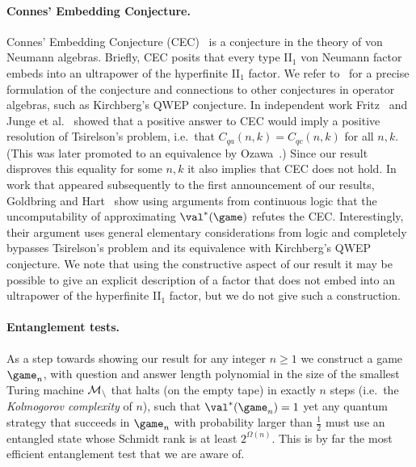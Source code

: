 \paragraph{Connes' Embedding Conjecture.} 
Connes' Embedding Conjecture (CEC)~\cite{connes1976classification} is a conjecture in the theory of von Neumann algebras. Briefly, CEC posits that every type II$_1$ von Neumann factor embeds into an ultrapower of the hyperfinite II$_1$ factor. We refer to~\cite{ozawa2013connes} for a precise formulation of the conjecture and connections to other conjectures in operator algebras, such as  Kirchberg's QWEP conjecture. In independent work Fritz~\cite{fritz2012tsirelson} and Junge et al.~\cite{junge2011connes} showed that a positive answer to CEC would imply a positive resolution of Tsirelson's problem, i.e.\ that $C_{qa}(n,k)=C_{qc}(n,k)$ for all $n,k$. (This was later promoted to an equivalence by Ozawa~\cite{ozawa2013connes}.) Since our result disproves this equality for some $n,k$ it also implies that CEC does not hold. In work that appeared subsequently to the first announcement of our results, Goldbring and Hart~\cite{goldbring2016computability,goldbring2020universal} show using arguments from continuous logic that the uncomputability of approximating $\val^*(\game)$ refutes the CEC. Interestingly, their argument uses general elementary considerations from logic and completely bypasses Tsirelson's problem and its equivalence with Kirchberg's QWEP conjecture. We note that using the constructive aspect of our result it may be possible to give an explicit description of a factor that does not embed into an ultrapower of the hyperfinite II$_1$ factor, but we do not give such a construction. 

\paragraph{Entanglement tests.} As a step towards showing our result for any integer $n\geq 1$ we construct a game $\game_n$, with question and answer length polynomial in the size of the smallest Turing machine $\cal{M}_n$ that halts (on the empty tape) in exactly $n$ steps (i.e.\ the \emph{Kolmogorov complexity} of $n$), such that $\val^*(\game_n)=1$ yet any quantum strategy that succeeds in $\game_n$ with probability larger than $\frac{1}{2}$ must use an entangled state whose Schmidt rank is at least $2^{\Omega(n)}$. This is by far the most efficient entanglement test that we are aware of.

